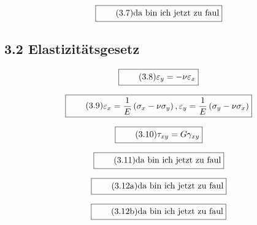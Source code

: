 \documentclass[11pt]{article}
\newcommand{\1}{ {\mathds{1}} }
\begin{document}
    \begin{equation}
      \boxed{
        \tag{3.7}
        \begin{split}
          \text{da bin ich jetzt zu faul}
        \end{split}
      }
    \end{equation}

    \subsection*{3.2 Elastizitätsgesetz}

    \begin{equation}
      \boxed{
        \tag{3.8}
        \begin{split}
			\varepsilon_y = -\nu \varepsilon_x
        \end{split}
      }
    \end{equation}

    \begin{equation}
      \boxed{
        \tag{3.9}
        \begin{split}
			\varepsilon_x = \frac{1}{E} \left( \sigma_x - \nu\sigma_y \right), 
			\varepsilon_y = \frac{1}{E} \left( \sigma_y - \nu\sigma_x \right)
        \end{split}
      }
    \end{equation}

    \begin{equation}
      \boxed{
        \tag{3.10}
        \begin{split}
			\tau_{xy} = G \gamma_{xy}
        \end{split}
      }
    \end{equation}

    \begin{equation}
      \boxed{
        \tag{3.11}
        \begin{split}
          \text{da bin ich jetzt zu faul}
        \end{split}
      }
    \end{equation}

    \begin{equation}
      \boxed{
        \tag{3.12a}
        \begin{split}
          \text{da bin ich jetzt zu faul}
        \end{split}
      }
    \end{equation}

    \begin{equation}
      \boxed{
        \tag{3.12b}
        \begin{split}
          \text{da bin ich jetzt zu faul}
        \end{split}
      }
    \end{equation}
\end{document}
